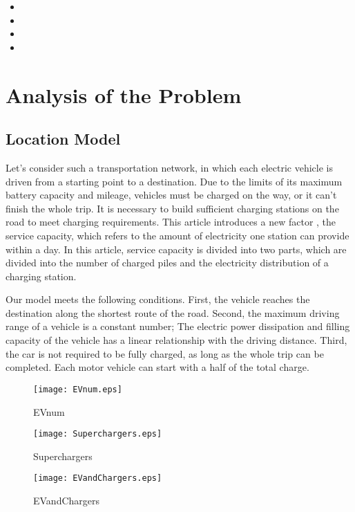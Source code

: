\documentclass{mcmthesis}
\begin{document}
\begin{itemize}
\item
\item
\item
\item
\end{itemize}


\section{Analysis of the Problem}

\subsection {Location Model} 


      Let's consider such a transportation network, in which each electric vehicle is driven from a starting point to a destination. Due to the limits of its maximum battery capacity and mileage, vehicles must be charged on the way, or it can’t finish the whole trip. It is necessary to build sufficient charging stations on the road to meet charging requirements. This article introduces a new factor , the service capacity,  which refers to the amount of electricity one station can provide within a day.  In this article, service capacity is divided into two parts, which are divided into the number of charged piles and the electricity distribution of a charging station.

Our model meets the following conditions. First, the vehicle reaches the destination along the shortest route of the road. Second, the maximum driving range  of a vehicle is a constant number; The electric power dissipation and filling capacity of the vehicle has a linear relationship with the driving distance. Third, the car is not required to be fully charged, as long as the whole trip can be completed. Each motor vehicle can start with a half of the total charge.


\begin{figure}[htbp]
\small
\centering
\texttt{[image: EVnum.eps]}
\caption{EVnum} 
\end{figure}

\begin{figure}[htbp]
\small
\centering
\texttt{[image: Superchargers.eps]}
\caption{Superchargers} 
\end{figure}

\begin{figure}[htbp]
\small
\centering
\texttt{[image: EVandChargers.eps]}
\caption{EVandChargers} 
\end{figure}
\end{document}
